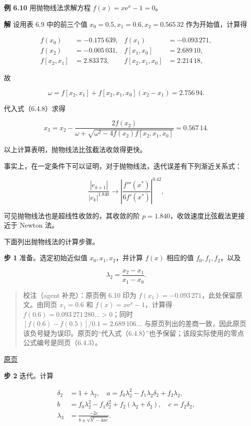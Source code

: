 \documentclass[
  10pt,
  fontset=fandol]{ctexart}
\begin{document}
\textbf{例 6.10} 用抛物线法求解方程 \(f(x)=x\mathrm{e}^x-1=0\)。

\textbf{解} 设用表 6.9 中的前三个值 \(x_0=0.5,x_1=0.6,x_2=0.565\,32\) 作为开始值，计算得

\[
\begin{aligned}
f(x_0)&=-0.175\,639,& f(x_1)&=-0.093\,271,\\
f(x_2)&=-0.005\,031,& f[x_1,x_0]&=2.689\,10,\\
f[x_2,x_1]&=2.833\,73,& f[x_2,x_1,x_0]&=2.214\,18,
\end{aligned}
\]

故

\[
\omega=f[x_2,x_1]+f[x_2,x_1,x_0](x_2-x_1)=2.756\,94.
\]

代入式（6.4.8）求得

\[
x_3=x_2-\frac{2f(x_2)}{\omega+\sqrt{\omega^2-4f(x_2)f[x_2,x_1,x_0]}}=0.567\,14.
\]

以上计算表明，抛物线法比弦截法收敛得更快。

事实上，在一定条件下可以证明，对于抛物线法，迭代误差有下列渐近关系式：

\[
\frac{|e_{k+1}|}{|e_k|^{1.840}}\to\left|\frac{f'''(x^*)}{6f'(x^*)}\right|^{0.42},
\]

可见抛物线法也是超线性收敛的，其收敛的阶 \(p=1.840\)，收敛速度比弦截法更接近于 Newton 法。

下面列出抛物线法的计算步骤。

\textbf{步 1} 准备。选定初始近似值 \(x_0,x_1,x_2\)，并计算 \(f(x)\) 相应的值 \(f_0,f_1,f_2\)，以及

\[
\lambda_2=\frac{x_2-x_1}{x_1-x_0}.
\]

\begin{quote}
校注（agent 补充）：原页例 6.10 印为 \(f(x_1)=-0.093\,271\)，此处保留原文。由同页 \(x_1=0.6\) 和 \(f(x)=x\mathrm{e}^x-1\)，计算得 \(f(0.6)=0.093\,271\,280\ldots>0\)；同时 \([f(0.6)-f(0.5)]/0.1=2.689\,106\ldots\) 与原页列出的差商一致，因此原页该负号疑为误印。原页的``代入式（6.4.8）''也予保留；该段实际使用的零点公式编号是同页（6.4.3）。
\end{quote}

\href{../../source-images/pdf-171.jpeg}{原页}

\textbf{步 2} 迭代。计算

\[
\begin{aligned}
\delta_2&=1+\lambda_2,\quad a=f_0\lambda_2^2-f_1\lambda_2\delta_2+f_2\lambda_2,\\
b&=f_0\lambda_2^2-f_1\delta_2^2+f_2(\lambda_2+\delta_2),\quad c=f_2\delta_2,\\
\lambda_3&=\frac{-2c}{b\pm\sqrt{b^2-4ac}}.
\end{aligned}
\]
\end{document}
